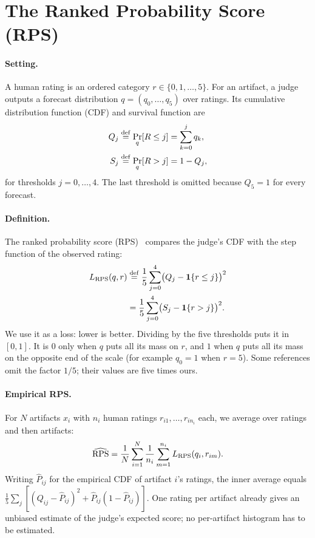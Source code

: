 \section{The Ranked Probability Score (RPS)}\label{app:rps}

\paragraph{Setting.}
A human rating is an ordered category $r\in\{0,1,\dots,5\}$.
For an artifact, a judge outputs a forecast distribution $q=(q_0,\dots,q_5)$ over ratings.
Its cumulative distribution function (CDF) and survival function are
\begin{align}
Q_j &\stackrel{\rm def}{=} \Pr_q[R\le j]=\sum_{k=0}^{j} q_k,\\
S_j &\stackrel{\rm def}{=} \Pr_q[R> j]=1-Q_j,
\end{align}
for thresholds $j=0,\dots,4$.
The last threshold is omitted because $Q_5=1$ for every forecast.

\paragraph{Definition.}
The ranked probability score (RPS)~\citep{epstein1969scoring} compares the judge's CDF with the step function of the observed rating:
\begin{align}
L_{\rm RPS}(q,r) &\stackrel{\rm def}{=} \frac{1}{5}\sum_{j=0}^{4}\bigl(Q_j-\mathbf{1}\{r\le j\}\bigr)^2 \label{eq:rps-cdf}\\
&= \frac{1}{5}\sum_{j=0}^{4}\bigl(S_j-\mathbf{1}\{r> j\}\bigr)^2. \label{eq:rps-sf}
\end{align}
We use it as a loss: lower is better.
Dividing by the five thresholds puts it in $[0,1]$.
It is $0$ only when $q$ puts all its mass on $r$, and $1$ when $q$ puts all its mass on the opposite end of the scale (for example $q_0=1$ when $r=5$).
Some references omit the factor $1/5$; their values are five times ours.

\paragraph{Empirical RPS.}
For $N$ artifacts $x_i$ with $n_i$ human ratings $r_{i1},\dots,r_{in_i}$ each, we average over ratings and then artifacts:
\begin{equation}
\widehat{\rm RPS}=\frac{1}{N}\sum_{i=1}^{N}\frac{1}{n_i}\sum_{m=1}^{n_i}L_{\rm RPS}(q_i,r_{im}).
\end{equation}
Writing $\hat P_{ij}$ for the empirical CDF of artifact $i$'s ratings, the inner average equals $\frac{1}{5}\sum_j[(Q_{ij}-\hat P_{ij})^2+\hat P_{ij}(1-\hat P_{ij})]$.
One rating per artifact already gives an unbiased estimate of the judge's expected score; no per-artifact histogram has to be estimated.

